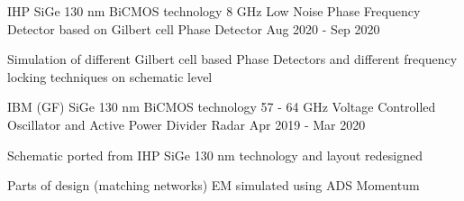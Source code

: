 \begin{cventries}

\cventry
{IHP SiGe 130 nm BiCMOS technology} %
{8 GHz Low Noise Phase Frequency Detector based on Gilbert cell} %
{Phase Detector} %
{Aug 2020 - Sep 2020} %
{ %
\begin{cvitems}
    \item {Simulation of different Gilbert cell based Phase Detectors and different frequency locking techniques on schematic level}
\end{cvitems} 
}


\cventry
{IBM (GF) SiGe 130 nm BiCMOS technology} %
{57 - 64 GHz Voltage Controlled Oscillator and Active Power Divider} %
{Radar} %
{Apr 2019 - Mar 2020} %
{ %
\begin{cvitems}
    \item {Schematic ported from IHP SiGe 130 nm technology and layout redesigned}
    \item {Parts of design (matching networks) EM simulated using ADS Momentum}
\end{cvitems} 
}






\end{cventries}
